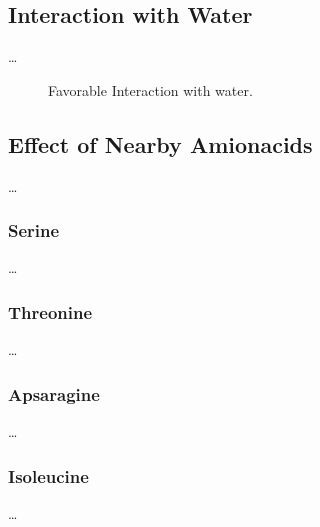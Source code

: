 \subsection{Interaction with Water}
\ldots
\begin{figure}[th!]
    \centering
    
    \caption[Short caption for Table of Figures]{Favorable Interaction with water.}
    \label{fig:H2O_fav}
\end{figure}

\subsection{Effect of Nearby Amionacids}
\ldots

\subsubsection{Serine}
\ldots
\subsubsection{Threonine}
\ldots
\subsubsection{Apsaragine}
\ldots
\subsubsection{Isoleucine}
\ldots

\cleardoublepage

